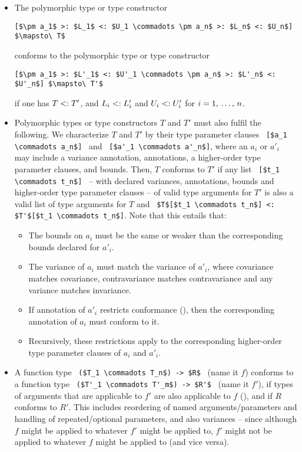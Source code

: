 \begin{itemize}
\item
The polymorphic type or type constructor 
\begin{lstlisting}
[$\pm a_1$ >: $L_1$ <: $U_1 \commadots \pm a_n$ >: $L_n$ <: $U_n$] $\mapsto\ T$
\end{lstlisting}
conforms to the polymorphic type or type constructor 
\begin{lstlisting}
[$\pm a_1$ >: $L'_1$ <: $U'_1 \commadots \pm a_n$ >: $L'_n$ <: $U'_n$] $\mapsto\ T'$
\end{lstlisting}
if one has $T <: T'$, and $L_i <: L'_i$ and $U_i <: U'_i$ for $i = 1 ,\, \ldots ,\, n$. 

\item
Polymorphic types or type constructors $T$ and $T'$ must also fulfil the following. We characterize $T$ and $T'$ by their type parameter clauses ~\lstinline![$a_1 \commadots a_n$]!~ and ~\lstinline![$a'_1 \commadots a'_n$]!, where an $a_i$ or $a'_i$ may include a variance annotation, annotations, a higher-order type parameter clauses, and bounds. Then, $T$ conforms to $T'$ if any list ~\lstinline![$t_1 \commadots t_n$]!~ -- with declared variances, annotations, bounds and higher-order type parameter clauses -- of valid type arguments for $T'$ is also a valid list of type arguments for $T$ and ~\lstinline!$T$[$t_1 \commadots t_n$] <: $T'$[$t_1 \commadots t_n$]!. Note that this entails that:
  \begin{itemize}
  \item The bounds on $a_i$ must be the same or weaker than the corresponding bounds declared for $a'_i$. 
  \item The variance of $a_i$ must match the variance of $a'_i$, where covariance matches covariance, contravariance matches contravariance and any variance matches invariance. 
  \item If annotation of $a'_i$ restricts conformance (), then the corresponding annotation of $a_i$ must conform to it. 
  \item Recursively, these restrictions apply to the corresponding higher-order type parameter clauses of $a_i$ and $a'_i$. 
  \end{itemize}

\item 
A function type ~\lstinline!($T_1 \commadots T_n$) -> $R$!~ (name it $f$) conforms to a function type ~\lstinline!($T'_1 \commadots T'_m$) -> $R'$!~ (name it $f'$), if types of arguments that are applicable to $f'$ are also applicable to $f$ (), and if $R$ conforms to $R'$. This includes reordering of named arguments/parameters and handling of repeated/optional parameters, and also variances -- since although $f$ might be applied to whatever $f'$ might be applied to, $f'$ might not be applied to whatever $f$ might be applied to (and vice versa).


\end{itemize}
